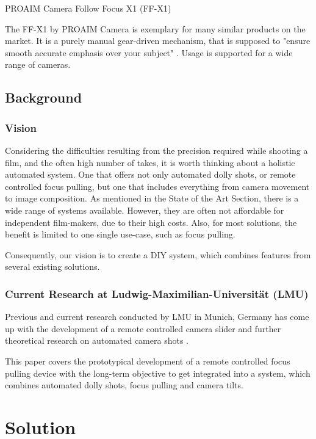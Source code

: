 \documentclass{sigchi}
\begin{document}
PROAIM Camera Follow Focus X1 (FF-X1)

The FF-X1 by PROAIM Camera is exemplary for many similar products on the market. It is a purely manual gear-driven mechanism, that is supposed to "ensure smooth accurate emphasis over your subject" \cite{proaim}. Usage is supported for a wide range of cameras. 


\subsection{Background}

\subsubsection{Vision}

Considering the difficulties resulting from the precision required while shooting a film, and the often high number of takes, it is worth thinking about a holistic automated system. One that offers not only automated dolly shots, or remote controlled focus pulling, but one that includes everything from camera movement to image composition. As mentioned in the State of the Art Section, there is a wide range of systems available. However, they are often not affordable for independent film-makers, due to their high costs. Also, for most solutions, the benefit is limited to one single use-case, such as focus pulling. 

Consequently, our vision is to create a DIY system, which combines features from several existing solutions.    


\subsubsection{Current Research at Ludwig-Maximilian-Universit\"at (LMU)}

Previous and current research conducted by LMU in Munich, Germany has come up with the development of a remote controlled camera slider \cite{pmoerwald} and further theoretical research on automated camera shots \cite{pburgdorf}. 

This paper covers the prototypical development of a remote controlled focus pulling device with the long-term objective to get integrated into a system, which combines automated dolly shots, focus pulling and camera tilts.

\section{Solution}
\end{document}
